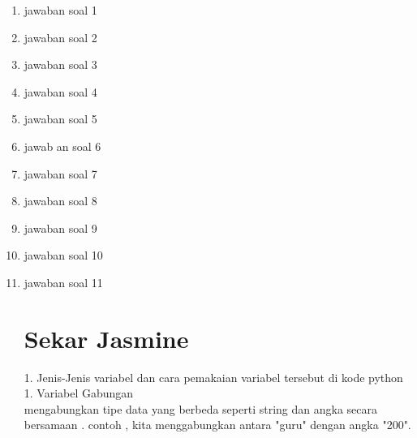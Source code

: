 \begin{enumerate}

\item jawaban soal 1

\item jawaban soal 2

\item jawaban soal 3

\item jawaban soal 4

\item jawaban soal 5

\item jawab an soal 6

\item jawaban soal 7

\item jawaban soal 8

\item jawaban soal 9

\item jawaban soal 10

\item jawaban soal 11


\section{Sekar Jasmine}

1. Jenis-Jenis variabel dan cara pemakaian variabel tersebut di kode python\\
    1. Variabel Gabungan\\
    
    mengabungkan tipe data yang berbeda seperti string dan angka secara bersamaan . contoh , kita menggabungkan antara "guru" dengan angka "200".
    

\end{enumerate}
